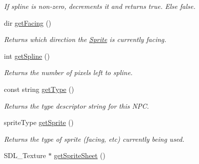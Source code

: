 \begin{DoxyCompactItemize}
\begin{DoxyCompactList}\small\item\em If spline is non-\/zero, decrements it and returns true. Else false. \end{DoxyCompactList}\item 
dir \hyperlink{class_sprite_a6bf9e87449da385e99c02586eadf5de6}{get\+Facing} ()\hypertarget{class_sprite_a6bf9e87449da385e99c02586eadf5de6}{}\label{class_sprite_a6bf9e87449da385e99c02586eadf5de6}

\begin{DoxyCompactList}\small\item\em Returns which direction the \hyperlink{class_sprite}{Sprite} is currently facing. \end{DoxyCompactList}\item 
int \hyperlink{class_sprite_aad5e5beb45ec5eae6fe8d096d5ebef68}{get\+Spline} ()\hypertarget{class_sprite_aad5e5beb45ec5eae6fe8d096d5ebef68}{}\label{class_sprite_aad5e5beb45ec5eae6fe8d096d5ebef68}

\begin{DoxyCompactList}\small\item\em Returns the number of pixels left to spline. \end{DoxyCompactList}\item 
const string \hyperlink{class_sprite_a58c0213b779c1174473852a090efaa72}{get\+Type} ()\hypertarget{class_sprite_a58c0213b779c1174473852a090efaa72}{}\label{class_sprite_a58c0213b779c1174473852a090efaa72}

\begin{DoxyCompactList}\small\item\em Returns the type descriptor string for this N\+PC. \end{DoxyCompactList}\item 
sprite\+Type \hyperlink{class_sprite_a01742e39c9f18622a094a187d6858912}{get\+Sprite} ()\hypertarget{class_sprite_a01742e39c9f18622a094a187d6858912}{}\label{class_sprite_a01742e39c9f18622a094a187d6858912}

\begin{DoxyCompactList}\small\item\em Returns the type of sprite (facing, etc) currently being used. \end{DoxyCompactList}\item 
S\+D\+L\+\_\+\+Texture $\ast$ \hyperlink{class_sprite_abec247d2cd9396834344c3cfe81eddc1}{get\+Sprite\+Sheet} ()\hypertarget{class_sprite_abec247d2cd9396834344c3cfe81eddc1}{}\label{class_sprite_abec247d2cd9396834344c3cfe81eddc1}


\end{DoxyCompactItemize}
